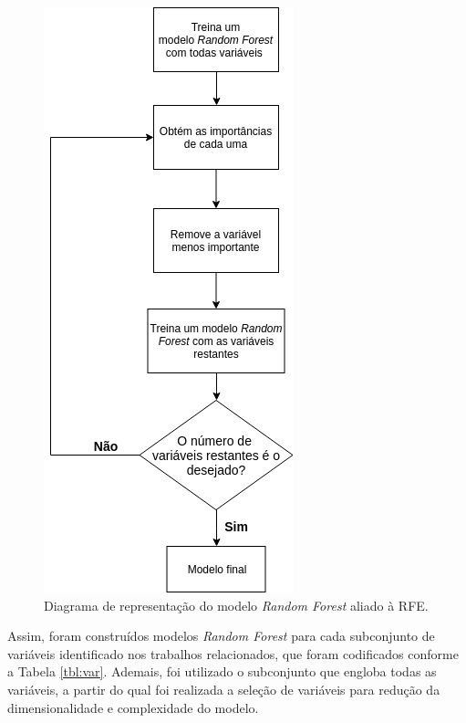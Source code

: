 \begin{figure}[H]
\centering
    \includegraphics[scale=0.5]{imgs/RF-RFE.png}
    \caption{Diagrama de representação do modelo \textit{Random Forest} aliado à RFE.}\label{fig:abordagem}
\end{figure}

Assim, foram construídos modelos \textit{Random Forest} para cada subconjunto de variáveis identificado nos trabalhos relacionados, que foram codificados conforme a Tabela \ref{tbl:var}. Ademais, foi utilizado o subconjunto que engloba todas as variáveis, a partir do qual foi realizada a seleção de variáveis para redução da dimensionalidade e complexidade do modelo.

